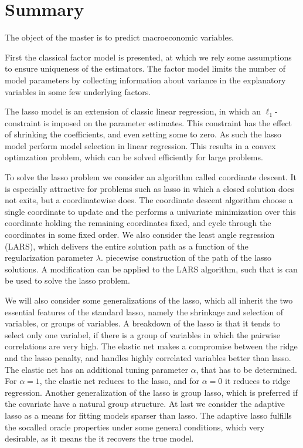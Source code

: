 \chapter{Summary}
%
The object of the master is to predict macroeconomic variables.

First the classical factor model is presented, at which we rely some assumptions to ensure uniqueness of the estimators.
The factor model limits the number of model parameters by collecting information about variance in the explanatory variables in some few underlying factors.

The lasso model is an extension of classic linear regression, in which an \(\ell_1\)-constraint is imposed on the parameter estimates.
This constraint has the effect of shrinking the coefficients, and even setting some to zero.
As such the lasso model perform model selection in linear regression.
This results in a convex optimzation problem, which can be solved efficiently for large problems.

To solve the lasso problem we consider an algorithm called coordinate descent.
It is especially attractive for problems such as lasso in which a closed solution does not exits, but a coordinatewise does.
The coordinate descent algorithm choose a single coordinate to update and the performs a univariate minimization over this coordinate holding the remaining coordinates fixed, and cycle through the coordinates in some fixed order.
We also consider the least angle regression (LARS), which delivers the entire solution path as a function of the regularization parameter \(\lambda\).
piecewise construction of the path of the lasso solutions.
A modification can be applied to the LARS algorithm, such that is can be used to solve the lasso problem.

We will also consider some generalizations of the lasso, which all inherit the two essential features of the standard lasso, namely the shrinkage and selection of variables, or groups of variables.
A breakdown of the lasso is that it tends to select only one variabel, if there is a group of variables in which the pairwise correlations are very high.
The elastic net makes a compromise between the ridge and the lasso penalty, and handles highly correlated variables better than lasso. 
The elastic net has an additional tuning parameter \(\alpha\), that has to be determined. For \(\alpha = 1\), the elastic net reduces to the lasso, and for \(\alpha = 0\) it reduces to ridge regression.
Another generalization of the lasso is group lasso, which is preferred if the covariate have a natural group structure.
At last we consider the adaptive lasso as a means for fitting models sparser than lasso.
The adaptive lasso fulfills the socalled oracle properties under some general conditions, which very desirable, as it means the it recovers the true model. 

